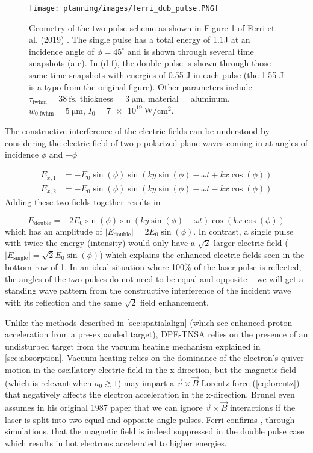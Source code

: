 \begin{figure}
	\centering 
	\texttt{[image: planning/images/ferri\_dub\_pulse.PNG]}
	\caption{Geometry of the two pulse scheme as shown in Figure 1 of Ferri et. al. (2019) \cite{Ferri_2019_Nat_Comm}. The single pulse has a total energy of 1.1J at an incidence angle of $\phi=45^\circ$ and is shown through several time snapshots (a-c). In (d-f), the double pulse is shown through those same time snapshots with energies of 0.55 J in each pulse (the 1.55 J is a typo from the original figure). Other parameters include $\tau_\text{fwhm} = \SI{38}{\femto \second}$, thickness = $\SI{3}{\micro \meter}$, material = aluminum, $w_\text{0,fwhm} = \SI{5}{\micro \meter}$, $I_0 = \SI{7e19}{\watt \per \centi \meter \squared}$.}
	\label{fig:ferri_dub_pulse}
\end{figure}
The constructive interference of the electric fields can be understood by considering the electric field of two p-polarized plane waves coming in at angles of incidence $\phi$ and $-\phi$

\begin{align}
	E_{x,1} &= -E_0 \sin(\phi) \sin(k y \sin(\phi) - \omega t + k x \cos(\phi)) \\
	E_{x,2} &= -E_0 \sin(\phi) \sin(k y \sin(\phi) - \omega t - k x \cos(\phi))
\end{align}
Adding these two fields together results in 

\begin{equation}
	E_\text{double} = -2 E_0 \sin(\phi) \sin(k y \sin(\phi) - \omega t) \cos(k x \cos(\phi))
\end{equation}
which has an amplitude of $\lvert E_\text{double} \rvert = 2 E_0 \sin(\phi)$. In contrast, a single pulse with twice the energy (intensity) would only have a $\sqrt{2}$ larger electric field ($\lvert E_\text{single} \rvert = \sqrt{2} E_0 \sin(\phi)$) which explains the enhanced electric fields seen in the bottom row of \cref{fig:ferri_dub_pulse}. In an ideal situation where 100\% of the laser pulse is reflected, the angles of the two pulses do not need to be equal and opposite -- we will get a standing wave pattern from the constructive interference of the incident wave with its reflection and the same $\sqrt{2}$ field enhancement.  

Unlike the methods described in \cref{sec:spatialalign} (which see enhanced proton acceleration from a pre-expanded target), \gls{DPE-TNSA} relies on the presence of an undisturbed target from the vacuum heating mechanism \cite{Brunel_1987_PRL} explained in \cref{sec:absorption}. Vacuum heating relies on the dominance of the electron's quiver motion in the oscillatory electric field in the x-direction, but the magnetic field (which is relevant when $a_0 \gtrsim 1$) may impart a $\vec{v} \times \vec{B}$ Lorentz force (\cref{eq:lorentz}) that negatively affects the electron acceleration in the x-direction. Brunel even assumes in his original 1987 paper \cite{Brunel_1987_PRL} that we can ignore $\vec{v} \times \vec{B}$ interactions if the laser is split into two equal and opposite angle pulses. Ferri confirms \cite{Ferri_2019_Nat_Comm}, through simulations, that the magnetic field is indeed suppressed in the double pulse case which results in hot electrons accelerated to higher energies. 

